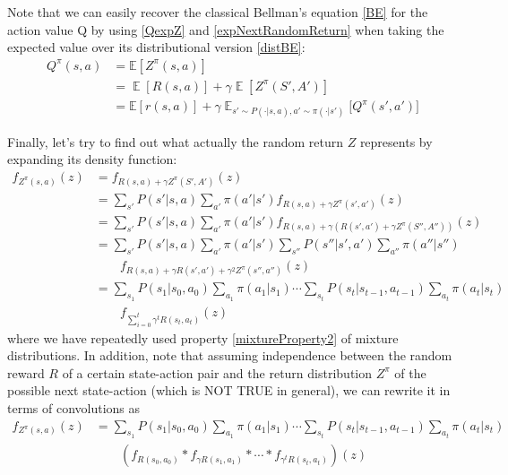 \documentclass[12pt,a4paper,openright,twoside]{article}
\DeclareMathOperator*{\E}{\mathbb{E}}
\numberwithin{equation}{section}
\theoremstyle{definition}
\theoremstyle{remark}
\theoremstyle{plain}
\begin{document}
Note that we can easily recover the classical Bellman's equation \ref{BE} for the action value Q by using \ref{QexpZ} and \ref{expNextRandomReturn} when taking the expected value over its distributional version \ref{distBE}:
\begin{equation}
\begin{split}
    Q^\pi(s,a) &= \mathbb{E} [Z^\pi(s,a)] \\
    &= \E[R(s,a)] + \gamma \E[Z^\pi(S',A')] \\
    &= \mathbb{E} [r(s,a)] + \gamma \E_{s'\sim P(\cdot | s,a), a' \sim \pi(\cdot | s')} \bigg[Q^\pi(s',a') \bigg] 
\end{split}
\end{equation}

Finally, let's try to find out what actually the random return $Z$ represents by expanding its density function: 
\begin{equation} \label{meaningZ}
\begin{split}
    f_{Z^\pi(s,a)}(z) &= f_{R(s,a) + \gamma Z^\pi(S',A')}(z)  \\
    &=  \sum_{s'} P(s' | s,a) \sum_{a'} \pi(a'|s') f_{R(s,a) + \gamma Z^\pi(s',a')}(z) \\
    &= \sum_{s'} P(s' | s,a) \sum_{a'} \pi(a'|s') f_{R(s,a) + \gamma (R(s',a') + \gamma Z^\pi(S'',A''))}(z) \\
    &= \sum_{s'} P(s' | s,a) \sum_{a'} \pi(a'|s') \sum_{s''} P(s'' | s',a') \sum_{a''} \pi(a''|s'') \\
    & \quad \quad f_{R(s,a) + \gamma R(s',a') + \gamma^2 Z^\pi(s'',a'')} (z) \\
    &= \sum_{s_{1}} P(s_{1} | s_{0},a_{0}) \sum_{a_{1}} \pi(a_{1}|s_{1})  \cdots \sum_{s_{t}} P(s_{t} | s_{t-1},a_{t-1}) \sum_{a_{t}} \pi(a_{t}|s_{t}) \\
    & \quad \quad f_{\sum_{i=0}^{t} \gamma^t R(s_{t},a_{t})} (z)
\end{split}
\end{equation}
where we have repeatedly used property \ref{mixtureProperty2} of mixture distributions. In addition, note that assuming independence between the random reward $R$ of a certain state-action pair and the return distribution $Z^\pi$ of the possible next state-action (which is NOT TRUE in general), we can rewrite it in terms of convolutions as
\begin{equation}
\begin{split}
    f_{Z^\pi(s,a)}(z) &= \sum_{s_{1}} P(s_{1} | s_{0},a_{0}) \sum_{a_{1}} \pi(a_{1}|s_{1})  \cdots \sum_{s_{t}} P(s_{t} | s_{t-1},a_{t-1}) \sum_{a_{t}} \pi(a_{t}|s_{t}) \\
    & \quad \quad  \left( f_{R(s_0,a_0)} * f_{\gamma R(s_1,a_1)} *  \cdots * f_{\gamma^t R(s_{t},a_{t})} \right) (z)
\end{split}
\end{equation}
\end{document}
